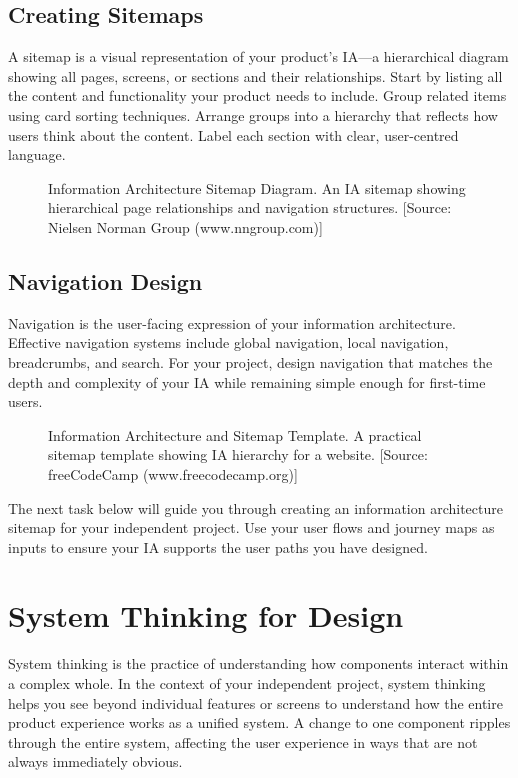 \documentclass[12pt,a4paper]{article}
\begin{document}
\subsection*{Creating Sitemaps}
A sitemap is a visual representation of your product’s IA—a hierarchical diagram showing all pages, screens, or sections and their relationships. Start by listing all the content and functionality your product needs to include. Group related items using card sorting techniques. Arrange groups into a hierarchy that reflects how users think about the content. Label each section with clear, user-centred language.

\begin{figure}[h!]
    \centering
    \caption{Information Architecture Sitemap Diagram. An IA sitemap showing hierarchical page relationships and navigation structures. [Source: Nielsen Norman Group (www.nngroup.com)]}
\end{figure}

\subsection*{Navigation Design}
Navigation is the user-facing expression of your information architecture. Effective navigation systems include global navigation, local navigation, breadcrumbs, and search. For your project, design navigation that matches the depth and complexity of your IA while remaining simple enough for first-time users.

\begin{figure}[h!]
    \centering
    \caption{Information Architecture and Sitemap Template. A practical sitemap template showing IA hierarchy for a website. [Source: freeCodeCamp (www.freecodecamp.org)]}
\end{figure}

The next task below will guide you through creating an information architecture sitemap for your independent project. Use your user flows and journey maps as inputs to ensure your IA supports the user paths you have designed.

\section*{System Thinking for Design}
System thinking is the practice of understanding how components interact within a complex whole. In the context of your independent project, system thinking helps you see beyond individual features or screens to understand how the entire product experience works as a unified system. A change to one component ripples through the entire system, affecting the user experience in ways that are not always immediately obvious.
\end{document}
